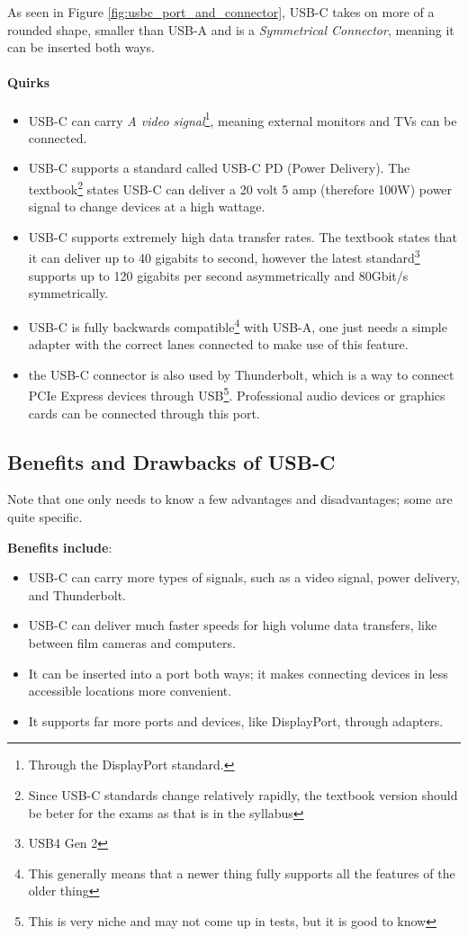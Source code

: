 \documentclass[../main.tex]{subfiles}
\begin{document}
As seen in Figure \ref{fig:usbc_port_and_connector}, USB-C takes on more of a rounded shape, smaller than USB-A and is a \emph{Symmetrical Connector}, meaning it can be inserted both ways.

\newpage

\paragraph{Quirks}

\begin{itemize}
    \item USB-C can carry \emph{A video signal}\footnote{Through the DisplayPort standard.}, meaning external monitors and TVs can be connected.
    \item USB-C supports a standard called USB-C PD (Power Delivery). The textbook\footnote{Since USB-C standards change relatively rapidly,
          the textbook version should be beter for the exams as that is in the syllabus} states USB-C can deliver a 20 volt 5 amp
          (therefore 100W) power signal to change devices at a high wattage.
    \item USB-C supports extremely high data transfer rates. The textbook states that it can deliver up to 40 gigabits to second, however the latest standard\footnote{USB4 Gen 2} supports up to 120 gigabits per second asymmetrically and 80Gbit/s symmetrically.
    \item USB-C is fully backwards compatible\footnote{This generally means that a newer thing fully supports all the features of the older thing} with USB-A, one just needs a simple adapter with the correct lanes connected to make use of this feature.
    \item the USB-C connector is also used by Thunderbolt, which is a way to connect PCIe Express devices through USB\footnote{This is very niche and may not come up in tests, but it is good to know}. Professional audio devices or graphics cards can be connected through this port.
\end{itemize}

\subsection{Benefits and Drawbacks of USB-C}

Note that one only needs to know a few advantages and disadvantages; some are quite specific.

\textbf{Benefits include}:
\begin{itemize}
    \item USB-C can carry more types of signals, such as a video signal, power delivery, and Thunderbolt.
    \item USB-C can deliver much faster speeds for high volume data transfers, like between film cameras and computers.
    \item It can be inserted into a port both ways; it makes connecting devices in less accessible locations more convenient.
    \item It supports far more ports and devices, like DisplayPort, through adapters.
\end{itemize}
\end{document}
